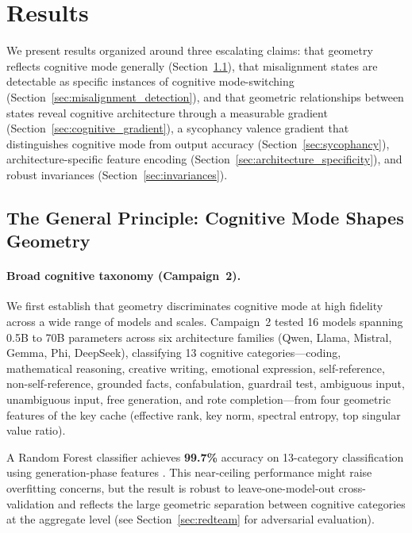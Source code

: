 
\section{Results}
\label{sec:results}

We present results organized around three escalating claims: that \kvcache geometry reflects cognitive mode generally (Section~\ref{sec:general_principle}), that misalignment states are detectable as specific instances of cognitive mode-switching (Section~\ref{sec:misalignment_detection}), and that geometric relationships between states reveal cognitive architecture through a measurable gradient (Section~\ref{sec:cognitive_gradient}), a sycophancy valence gradient that distinguishes cognitive mode from output accuracy (Section~\ref{sec:sycophancy}), architecture-specific feature encoding (Section~\ref{sec:architecture_specificity}), and robust invariances (Section~\ref{sec:invariances}).

\subsection{The General Principle: Cognitive Mode Shapes Geometry}
\label{sec:general_principle}

\paragraph{Broad cognitive taxonomy (Campaign~2).}
We first establish that \kvcache geometry discriminates cognitive mode at high fidelity across a wide range of models and scales.
Campaign~2 tested 16 models spanning 0.5B to 70B parameters across six architecture families (Qwen, Llama, Mistral, Gemma, Phi, DeepSeek), classifying 13 cognitive categories---coding, mathematical reasoning, creative writing, emotional expression, self-reference, non-self-reference, grounded facts, confabulation, guardrail test, ambiguous input, unambiguous input, free generation, and rote completion---from four geometric features of the key cache (effective rank, key norm, spectral entropy, top singular value ratio).

A Random Forest classifier achieves \textbf{99.7\%} accuracy on 13-category classification using generation-phase features \cite{campaign2}.
This near-ceiling performance might raise overfitting concerns, but the result is robust to leave-one-model-out cross-validation and reflects the large geometric separation between cognitive categories at the aggregate level (see Section~\ref{sec:redteam} for adversarial evaluation).

